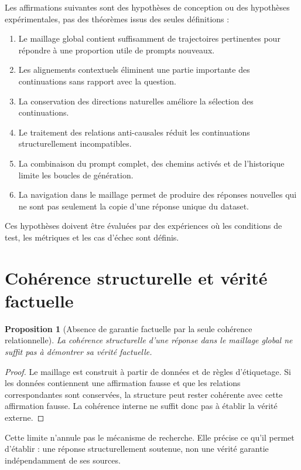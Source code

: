 \documentclass[11pt,a4paper]{report}
\theoremstyle{definition}
\theoremstyle{plain}
\newtheorem{proposition}[definition]{Proposition}
\theoremstyle{remark}
\begin{document}
Les affirmations suivantes sont des hypothèses de conception
ou des hypothèses expérimentales, pas des théorèmes issus des
seules définitions :

\begin{enumerate}[label=\arabic*.]
  \item Le maillage global contient suffisamment de trajectoires
        pertinentes pour répondre à une proportion utile de
        prompts nouveaux.
  \item Les alignements contextuels éliminent une partie importante
        des continuations sans rapport avec la question.
  \item La conservation des directions naturelles améliore la
        sélection des continuations.
  \item Le traitement des relations anti-causales réduit les
        continuations structurellement incompatibles.
  \item La combinaison du prompt complet, des chemins activés et
        de l'historique limite les boucles de génération.
  \item La navigation dans le maillage permet de produire des
        réponses nouvelles qui ne sont pas seulement la copie
        d'une réponse unique du dataset.
\end{enumerate}

Ces hypothèses doivent être évaluées par des expériences où les
conditions de test, les métriques et les cas d'échec sont définis.

\section{Cohérence structurelle et vérité factuelle}

\begin{proposition}[Absence de garantie factuelle par la seule
cohérence relationnelle]
La cohérence structurelle d'une réponse dans le maillage global
ne suffit pas à démontrer sa vérité factuelle.
\end{proposition}

\begin{proof}
Le maillage est construit à partir de données et de règles
d'étiquetage. Si les données contiennent une affirmation fausse
et que les relations correspondantes sont conservées, la
structure peut rester cohérente avec cette affirmation fausse.
La cohérence interne ne suffit donc pas à établir la vérité
externe.
\end{proof}

Cette limite n'annule pas le mécanisme de recherche. Elle
précise ce qu'il permet d'établir : une réponse structurellement
soutenue, non une vérité garantie indépendamment de ses sources.
\end{document}
